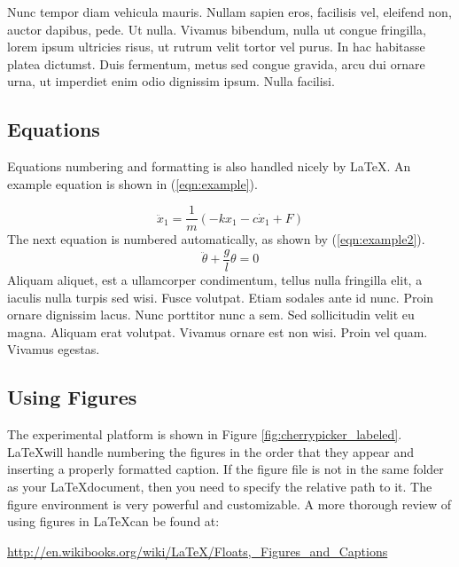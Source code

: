 \documentclass[11pt]{article}
\begin{document}
Nunc tempor diam vehicula mauris. Nullam sapien eros, facilisis vel, eleifend non, auctor dapibus, pede. Ut nulla. Vivamus bibendum, nulla ut congue fringilla, lorem ipsum ultricies risus, ut rutrum velit tortor vel purus. In hac habitasse platea dictumst. Duis fermentum, metus sed congue gravida, arcu dui ornare urna, ut imperdiet enim odio dignissim ipsum. Nulla facilisi. 


\subsection{Equations}
\label{sec:subsection_label}
\vspace{-0.2in}
%
Equations numbering and formatting is also handled nicely by \LaTeX. An example equation is shown in (\ref{eqn:example}).

%
\begin{equation}
\ddot{x}_1 = \frac{1}{m}\left(-k x_1 - c\dot{x}_1 + F\right)
\label{eqn:example}
\end{equation}
%
The next equation is numbered automatically, as shown by (\ref{eqn:example2}).
%
\begin{equation}
\ddot{\theta} + \frac{g}{l}\theta = 0
\label{eqn:example2}
\end{equation}
%
Aliquam aliquet, est a ullamcorper condimentum, tellus nulla fringilla elit, a iaculis nulla turpis sed wisi. Fusce volutpat. Etiam sodales ante id nunc. Proin ornare dignissim lacus. Nunc porttitor nunc a sem. Sed sollicitudin velit eu magna. Aliquam erat volutpat. Vivamus ornare est non wisi. Proin vel quam. Vivamus egestas. 


\subsection{Using Figures}
\label{sec:using_figures}
\vspace{-0.2in}
%
The experimental platform is shown in Figure \ref{fig:cherrypicker_labeled}. \LaTeX will handle numbering the figures in the order that they appear and inserting a properly formatted caption. 
If the figure file is not in the same folder as your \LaTeX document, then you need to specify the relative path to it. The figure environment is very powerful and customizable. A more thorough review of using figures in \LaTeX can be found at: 

\hspace{0.25in}\url{http://en.wikibooks.org/wiki/LaTeX/Floats,_Figures_and_Captions}
%
\end{document}

